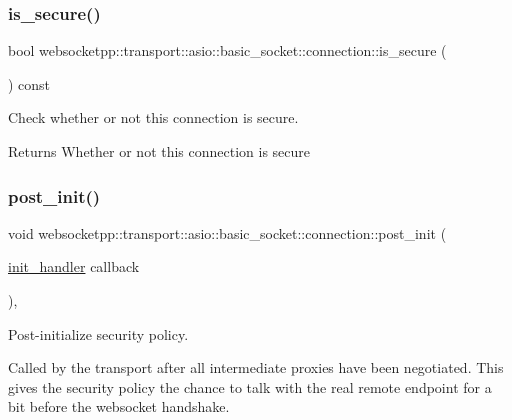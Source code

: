 \subsubsection{\texorpdfstring{is\+\_\+secure()}{is\_secure()}}
{\footnotesize\ttfamily bool websocketpp\+::transport\+::asio\+::basic\+\_\+socket\+::connection\+::is\+\_\+secure (\begin{DoxyParamCaption}{ }\end{DoxyParamCaption}) const\hspace{0.3cm}{\ttfamily [inline]}}



Check whether or not this connection is secure. 

\begin{DoxyReturn}{Returns}
Whether or not this connection is secure 
\end{DoxyReturn}
\mbox{\label{classwebsocketpp_1_1transport_1_1asio_1_1basic__socket_1_1connection_abeee4b73e1f47d21dd42e455f1272d64}} 
\subsubsection{\texorpdfstring{post\+\_\+init()}{post\_init()}}
{\footnotesize\ttfamily void websocketpp\+::transport\+::asio\+::basic\+\_\+socket\+::connection\+::post\+\_\+init (\begin{DoxyParamCaption}\item[{\mbox{\hyperlink{namespacewebsocketpp_1_1transport_aeae75e675c1a334b3b33ab7120b480a5}{init\+\_\+handler}}}]{callback }\end{DoxyParamCaption})\hspace{0.3cm}{\ttfamily [inline]}, {\ttfamily [protected]}}



Post-\/initialize security policy. 

Called by the transport after all intermediate proxies have been negotiated. This gives the security policy the chance to talk with the real remote endpoint for a bit before the websocket handshake.


